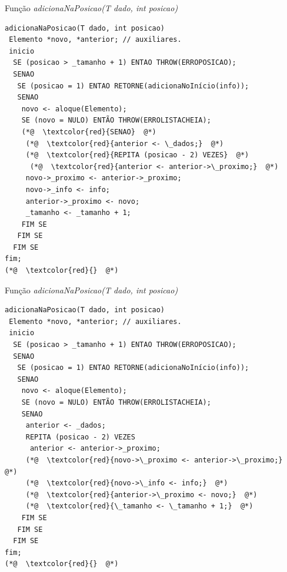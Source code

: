 \documentclass[12pt,table,xcolor={dvipsnames}]{beamer}
\begin{document}
\begin{frame}[fragile]{Função \textit{adicionaNaPosicao(T dado, int posicao)}}
\begin{lstlisting}
adicionaNaPosicao(T dado, int posicao)
 Elemento *novo, *anterior; // auxiliares.
 inicio
  SE (posicao > _tamanho + 1) ENTAO THROW(ERROPOSICAO);
  SENAO
   SE (posicao = 1) ENTAO RETORNE(adicionaNoInício(info));
   SENAO
    novo <- aloque(Elemento);
    SE (novo = NULO) ENTÃO THROW(ERROLISTACHEIA);
    (*@  \textcolor{red}{SENAO}  @*)
     (*@  \textcolor{red}{anterior <- \_dados;}  @*)
     (*@  \textcolor{red}{REPITA (posicao - 2) VEZES}  @*)
      (*@  \textcolor{red}{anterior <- anterior->\_proximo;}  @*)
     novo->_proximo <- anterior->_proximo;
     novo->_info <- info;
     anterior->_proximo <- novo;
     _tamanho <- _tamanho + 1;
    FIM SE
   FIM SE
  FIM SE
fim;
(*@  \textcolor{red}{}  @*)
\end{lstlisting}
\end{frame}

\begin{frame}[fragile]{Função \textit{adicionaNaPosicao(T dado, int posicao)}}
\begin{lstlisting}
adicionaNaPosicao(T dado, int posicao)
 Elemento *novo, *anterior; // auxiliares.
 inicio
  SE (posicao > _tamanho + 1) ENTAO THROW(ERROPOSICAO);
  SENAO
   SE (posicao = 1) ENTAO RETORNE(adicionaNoInício(info));
   SENAO
    novo <- aloque(Elemento);
    SE (novo = NULO) ENTÃO THROW(ERROLISTACHEIA);
    SENAO
     anterior <- _dados;
     REPITA (posicao - 2) VEZES
      anterior <- anterior->_proximo;
     (*@  \textcolor{red}{novo->\_proximo <- anterior->\_proximo;}  @*)
     (*@  \textcolor{red}{novo->\_info <- info;}  @*)
     (*@  \textcolor{red}{anterior->\_proximo <- novo;}  @*)
     (*@  \textcolor{red}{\_tamanho <- \_tamanho + 1;}  @*)
    FIM SE
   FIM SE
  FIM SE
fim;
(*@  \textcolor{red}{}  @*)
\end{lstlisting}
\end{frame}
\end{document}
